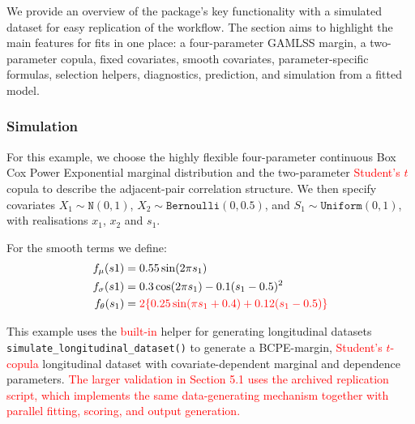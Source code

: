 \documentclass{article}
\newcommand{\jsschange}[1]{\textcolor{red}{#1}}
\begin{document}
We provide an overview of the package's key functionality with a simulated dataset for easy replication of the workflow. The section aims to highlight the main features for fits in one place: a four-parameter GAMLSS margin, a two-parameter copula, fixed covariates, smooth covariates, parameter-specific formulas, selection helpers, diagnostics, prediction, and simulation from a fitted model. 

\subsubsection{Simulation}

For this example, we choose the highly flexible four-parameter continuous Box Cox Power Exponential marginal distribution and the two-parameter \jsschange{Student's $t$} copula to describe the adjacent-pair correlation structure. We then specify covariates $X_1\sim \texttt{N}(0,1)$, $X_2\sim \texttt{Bernoulli}(0,0.5)$, and $S_1\sim \texttt{Uniform}(0,1)$, with realisations $x_1$, $x_2$ and $s_1$. 

For the smooth terms we define:
\begin{align*}
    f_{\mu}(s1)&=0.55\sin(2\pi s_1) \\
    f_{\sigma}(s1)&=0.3\cos(2\pi s_1) - 0.1(s_1-0.5)^2 \\
    f_{\theta}(s_1)&=\jsschange{2\{0.25\sin(\pi s_1 + 0.4) + 0.12(s_1-0.5)\}} \\    
\end{align*}

This example uses the \jsschange{built-in} helper for generating longitudinal datasets \texttt{simulate\_longitudinal\_dataset()} to generate a BCPE-margin, \jsschange{Student's $t$-copula} longitudinal dataset with covariate-dependent marginal and dependence parameters. \textcolor{red}{The larger validation in Section 5.1 uses the archived replication script, which implements the same data-generating mechanism together with parallel fitting, scoring, and output generation.}
\end{document}
